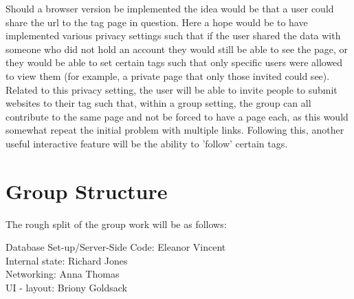 \documentclass[a4wide, 10pt]{article}
\begin{document}
Should a browser version be implemented the idea would be that a user could share the url to the tag page in question. Here a hope would be to have implemented various privacy settings such that if the user shared the data with someone who did not hold an account they would still be able to see the page, or they would be able to set certain tags such that only specific users were allowed to view them (for example, a private page that only those invited could see). Related to this privacy setting, the user will be able to invite people to submit websites to their tag such that, within a group setting, the group can all contribute to the same page and not be forced to have a page each, as this would somewhat repeat the initial problem with multiple links. Following this, another useful interactive feature will be the ability to 'follow' certain tags.

\section{Group Structure}

The rough split of the group work will be as follows:

Database Set-up/Server-Side Code: Eleanor Vincent \\
Internal state: Richard Jones \\
Networking: Anna Thomas \\
UI - layout: Briony Goldsack \\
\end{document}
